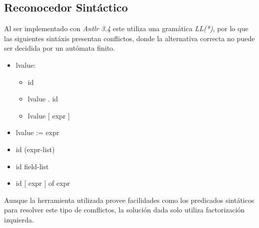 \documentclass[a4paper,10pt]{article}
\begin{document}
		\subsection{Reconocedor Sintáctico}
		
		Al ser implementado con \textit{Antlr 3.4} este utiliza una gramática \textit{LL(*)}, por lo que las siguientes sintáxis presentan conflictos, donde la alternativa correcta no puede ser decidida por un autómata finito.
		
		\begin{itemize}
			\item [] lvalue:
			\begin{itemize}
				\item [] id
				\item [] lvalue . id
				\item [] lvalue [ expr ]
			\end{itemize} 
			\item [] lvalue := expr
			\item [] id (expr-list)
			\item [] id {field-list}
			\item [] id [ expr ] of expr
		\end{itemize}
		
		Aunque la herramienta utilizada provee facilidades como los predicados sintáticos para resolver este tipo de comflictos, la solución dada solo utiliza factorización izquierda.
		
\end{document}
